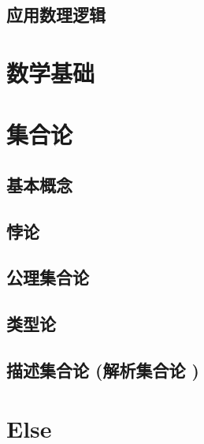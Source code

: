 \documentclass[UTF8]{../09-Mathematics}
\begin{document}
\section{应用数理逻辑}



\chapter{数学基础}


\chapter{集合论}
    \section{基本概念}
    \section{悖论}
    \section{公理集合论}
    \section{类型论}
    \section{描述集合论 (解析集合论 )}





\chapter{Else}
\end{document}

